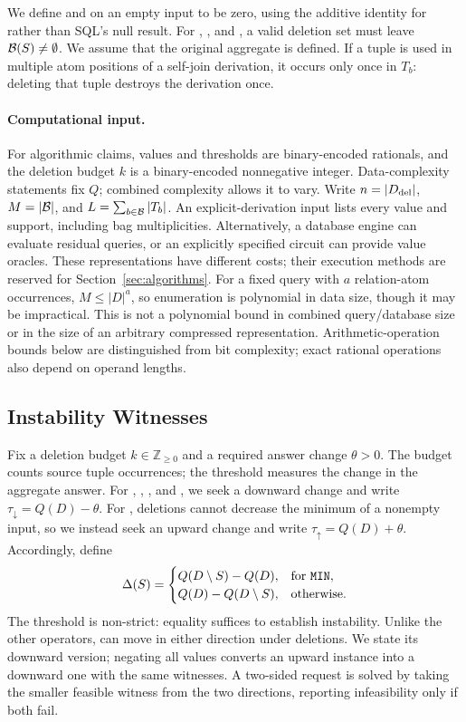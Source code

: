 We define  and  on an empty input to be zero,
using the additive identity for  rather than SQL's null result.
For , , and , a valid deletion set must
leave $\mathcal{B}(S)\ne\emptyset$. We assume that the original aggregate is defined. If a tuple is used in
multiple atom positions of a self-join derivation, it occurs only once in
$T_b$: deleting that tuple destroys the derivation once.

\paragraph{Computational input.}
For algorithmic claims, values and thresholds are binary-encoded rationals,
and the deletion budget $k$ is a binary-encoded nonnegative integer.
Data-complexity statements fix $Q$; combined complexity allows it to vary.
Write $n=|D_{\mathrm{del}}|$, $M=|\mathcal{B}|$, and $L=\sum_{b\in\mathcal{B}}|T_b|$.
An explicit-derivation input lists every value and support, including bag
multiplicities. Alternatively, a database engine can evaluate residual
queries, or an explicitly specified circuit can provide value oracles.
These representations have different costs; their execution methods are
reserved for Section~\ref{sec:algorithms}.
For a fixed query with $a$ relation-atom occurrences, $M\le |D|^a$,
so enumeration is polynomial in data size, though it may be impractical.
This is not a polynomial bound in combined query/database size or in the
size of an arbitrary compressed representation. Arithmetic-operation bounds
below are distinguished from bit complexity; exact rational operations
also depend on operand lengths.

\subsection{Instability Witnesses}
\label{sec:witnesses}

Fix a deletion budget $k\in\mathbb{Z}_{\ge0}$ and a required answer
change $\theta>0$. The budget counts source tuple occurrences; the
threshold measures the change in the aggregate answer. For , ,
, and , we seek a downward change and write
$\tau_{\downarrow}=Q(D)-\theta$. For , deletions cannot decrease
the minimum of a nonempty input, so we instead seek an upward change and
write $\tau_{\uparrow}=Q(D)+\theta$. Accordingly, define
\begin{equation}
\label{eq:deletion-benefit}
\Delta(S)=
\begin{cases}
Q(D\setminus S)-Q(D), & \text{for \textnormal{\texttt{MIN}}},\\
Q(D)-Q(D\setminus S), & \text{otherwise}.
\end{cases}
\end{equation}
The threshold is non-strict: equality suffices to establish instability.
Unlike the other operators,  can move in either direction under
deletions. We state its downward version; negating all values converts an
upward instance into a downward one with the same witnesses. A two-sided
 request is solved by taking the smaller feasible witness from
the two directions, reporting infeasibility only if both fail.

